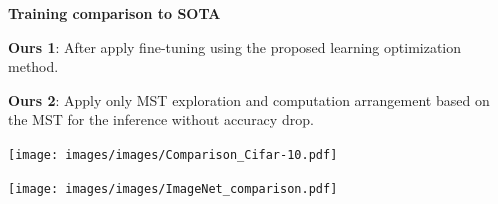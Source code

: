 \documentclass[landscape,a0paper,fontscale=0.292]{baposter}
\newcommand{\subheadercolor}{black}
\begin{document}
\begin{poster}
{\begin{minipage}[t]{0.5\linewidth}
	\vspace{1em}
	\textbf{\color{\subheadercolor}Training comparison to SOTA}
	\vspace{0.5em}
	\begin{itemize}
		\scriptsize{
		\item \textbf{Ours 1}: After apply fine-tuning using the proposed learning optimization method.
		\item \textbf{Ours 2}: Apply only MST exploration and computation arrangement based on the MST for the inference without accuracy drop.}
	\end{itemize}
	\vspace{-0.2em}
	\begin{center}
		\texttt{[image: images/images/Comparison\_Cifar-10.pdf]}
	\end{center} 
	\begin{center}
		\texttt{[image: images/images/ImageNet\_comparison.pdf]}
	\end{center} 
	

\end{minipage}}
\end{poster}
\end{document}
